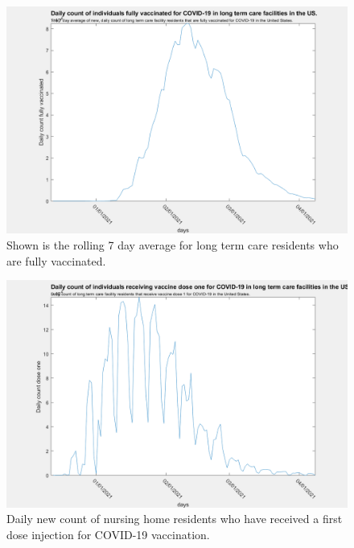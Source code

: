 \documentclass[twoside]{article}
\begin{document}
\begin{multicols}{2}
\begin{figure}[H]
	\includegraphics[width=\linewidth]{images/usa_daily_ltc_fully_vaccinated_processed.png}
	\caption{Shown is the rolling 7 day average for long term care residents who are fully vaccinated. }
	\label{fig:images/usa_daily_ltc_fully_vaccinated_processedLabel}
\end{figure}

\begin{figure}[H]
	\includegraphics[width=\linewidth]{images/usa_daily_ltc_first_dose_unprocessed.png}
	\caption{Daily new count of nursing home residents who have received a first dose injection for COVID-19 vaccination.}
	\label{fig:images/usa_daily_ltc_first_dose_unprocessedLabel}
\end{figure}


\end{multicols}
\end{document}
